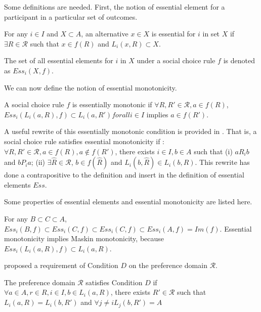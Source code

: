 Some definitions are needed. First, the notion of essential element
for a participant in a particular set of outcomes.

\begin{definition*}
For any $i \in I$ and $X \subset A$, an alternative $x \in X$ is
essential for $i$ in set $X$ if $\exists R \in \mathscr{R}$ such that
$x \in f(R)$ and $ L_i(x, R) \subset X$.
\end{definition*}

The set of all essential elements for $i$ in $X$ under a social choice
rule $f$ is denoted as $Ess_i(X, f)$.

We can now define the notion of essential monotonicity.

\begin{definition*}
A social choice rule $f$ is essentially monotonic if $\forall R, R' \in
\mathscr{R}, a \in f(R)$,  $Ess_i(L_i(a, R), f)
\subset L_i(a, R') for all  i \in I$ implies $a \in f(R')$. 
\end{definition*}

A useful rewrite of this essentially monotonic condition is provided
in \parencite{Yamato1992}. That is, a social choice rule satisfies essential
monotonicity if :  $\forall R, R' \in \mathscr{R}, a \in f(R), a \not
\in f(R')$,  there exists $i \in I, b \in A$ such that (i) $a R_i b$
and $b P_i a$; (ii) $\exists \hat{R} \in \mathscr{R}$, $b \in
f(\hat{R})$ and $L_i(b, \hat{R}) \in L_i(b, R)$.
This rewrite has done a contrapositive to the definition and
insert in the definition of essential elements $Ess$. 

\begin{remark}
Some properties of essential elements and essential monotonicity are
listed here. 

For any $ B \subset C \subset A$,  $Ess_i(B,f) \subset Ess_i(C,f)
\subset Ess_i(C,f) \subset Ess_i(A,f) = Im(f)$. Essential monotonicity
implies Maskin monotonicity, because $Ess_i(L_i(a, R), f) \subset L_i(a,R)$.
\end{remark}


\parencite{Yamato1992} proposed a requirement of Condition $D$ on the preference
domain $\mathscr{R}$.

\begin{definition*}
The preference domain $\mathscr{R}$ satisfies Condition $D$ if
$\forall a \in A, r \in R, i \in I, b \in L_i(a, R)$, there exists $R'
\in \mathscr{R}$ such that $L_i(a,R) = L_i(b, R')$ and $\forall j \not
= i  L_j(b,R')=A$
\end{definition*}

